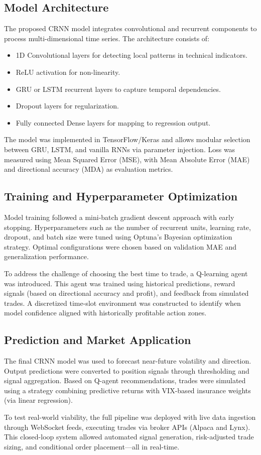 \documentclass[conference]{IEEEtran}
\begin{document}
\subsection{Model Architecture}
The proposed CRNN model integrates convolutional and recurrent components to process multi-dimensional time series. The architecture consists of:

\begin{itemize}
    \item 1D Convolutional layers for detecting local patterns in technical indicators.
    \item ReLU activation for non-linearity.
    \item GRU or LSTM recurrent layers to capture temporal dependencies.
    \item Dropout layers for regularization.
    \item Fully connected Dense layers for mapping to regression output.
\end{itemize}

The model was implemented in TensorFlow/Keras and allows modular selection between GRU, LSTM, and vanilla RNNs via parameter injection. Loss was measured using Mean Squared Error (MSE), with Mean Absolute Error (MAE) and directional accuracy (MDA) as evaluation metrics.

\subsection{Training and Hyperparameter Optimization}
Model training followed a mini-batch gradient descent approach with early stopping. Hyperparameters such as the number of recurrent units, learning rate, dropout, and batch size were tuned using Optuna's Bayesian optimization strategy. Optimal configurations were chosen based on validation MAE and generalization performance.

To address the challenge of choosing the best time to trade, a Q-learning agent was introduced. This agent was trained using historical predictions, reward signals (based on directional accuracy and profit), and feedback from simulated trades. A discretized time-slot environment was constructed to identify when model confidence aligned with historically profitable action zones.

\subsection{Prediction and Market Application}
The final CRNN model was used to forecast near-future volatility and direction. Output predictions were converted to position signals through thresholding and signal aggregation. Based on Q-agent recommendations, trades were simulated using a strategy combining predictive returns with VIX-based insurance weights (via linear regression).

To test real-world viability, the full pipeline was deployed with live data ingestion through WebSocket feeds, executing trades via broker APIs (Alpaca and Lynx). This closed-loop system allowed automated signal generation, risk-adjusted trade sizing, and conditional order placement—all in real-time.





\end{document}
